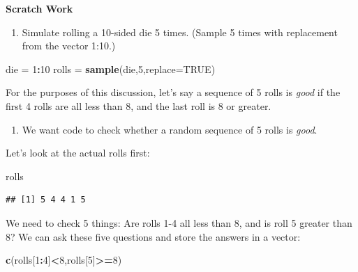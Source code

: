 \documentclass[
]{book}
\newenvironment{Shaded}{\begin{snugshade}}{\end{snugshade}}
\newcommand{\AttributeTok}[1]{\textcolor[rgb]{0.13,0.29,0.53}{#1}}
\newcommand{\ConstantTok}[1]{\textcolor[rgb]{0.56,0.35,0.01}{#1}}
\newcommand{\DecValTok}[1]{\textcolor[rgb]{0.00,0.00,0.81}{#1}}
\newcommand{\FunctionTok}[1]{\textcolor[rgb]{0.13,0.29,0.53}{\textbf{#1}}}
\newcommand{\NormalTok}[1]{#1}
\newcommand{\OtherTok}[1]{\textcolor[rgb]{0.56,0.35,0.01}{#1}}
\newcommand{\SpecialCharTok}[1]{\textcolor[rgb]{0.81,0.36,0.00}{\textbf{#1}}}
\providecommand{\tightlist}{%
  \setlength{\itemsep}{0pt}\setlength{\parskip}{0pt}}
\theoremstyle{definition}
\theoremstyle{definition}
\theoremstyle{definition}
\theoremstyle{definition}
\theoremstyle{remark}
\begin{document}
\textbf{Scratch Work}

\begin{enumerate}
\def\labelenumi{\arabic{enumi}.}
\tightlist
\item
  Simulate rolling a 10-sided die 5 times. (Sample 5 times with replacement from the vector 1:10.)
\end{enumerate}

\begin{Shaded}
\begin{Highlighting}[]
\NormalTok{die }\OtherTok{=} \DecValTok{1}\SpecialCharTok{:}\DecValTok{10}
\NormalTok{rolls }\OtherTok{=} \FunctionTok{sample}\NormalTok{(die,}\DecValTok{5}\NormalTok{,}\AttributeTok{replace=}\ConstantTok{TRUE}\NormalTok{)}
\end{Highlighting}
\end{Shaded}

For the purposes of this discussion, let's say a sequence of 5 rolls is \emph{good} if the first 4 rolls are all less than 8, and the last roll is 8 or greater.

\begin{enumerate}
\def\labelenumi{\arabic{enumi}.}
\setcounter{enumi}{1}
\tightlist
\item
  We want code to check whether a random sequence of 5 rolls is \emph{good}.
\end{enumerate}

Let's look at the actual rolls first:

\begin{Shaded}
\begin{Highlighting}[]
\NormalTok{rolls}
\end{Highlighting}
\end{Shaded}

\begin{verbatim}
## [1] 5 4 4 1 5
\end{verbatim}

We need to check 5 things: Are rolls 1-4 all less than 8, and is roll 5 greater than 8? We can ask these five questions and store the answers in a vector:

\begin{Shaded}
\begin{Highlighting}[]
\FunctionTok{c}\NormalTok{(rolls[}\DecValTok{1}\SpecialCharTok{:}\DecValTok{4}\NormalTok{]}\SpecialCharTok{\textless{}}\DecValTok{8}\NormalTok{,rolls[}\DecValTok{5}\NormalTok{]}\SpecialCharTok{\textgreater{}=}\DecValTok{8}\NormalTok{)}
\end{Highlighting}
\end{Shaded}
\end{document}
